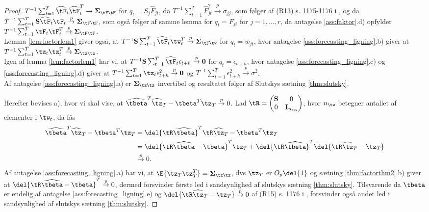\begin{proof}
\(T^{-1} \sum_{t=1}^T \widehat{\tF}_t \widehat{\tF}_t^T \rightarrow \boldsymbol{\Sigma}_{\tF \tF}\) for \(q_t = S_j \widehat{F}_{jt}\), da \(T^{-1} \sum_{t=1}^T \widehat{F}_{jt}^2 \overset{p}{\rightarrow} \sigma_{jj}\), som følger af (R13) s. 1175-1176 i \citep{stock_watson_2002a}, og da \(T^{-1} \sum_{t=1}^T \mathbf{S} \widehat{\tF}_t \tF_t \overset{p}{\rightarrow} \boldsymbol{\Sigma}_{\tF \tF}\), som også følger af samme lemma for \(q_t =F_{jt}\) for \(j=1,\ldots, r\), da antagelse \ref{ass:faktor}.d) opfylder \(T^{-1} \sum_{t=1}^T \tF_t \tF_t^T \overset{p}{\rightarrow} \boldsymbol{\Sigma}_{\tF\tF}\). \\ 
Lemma \ref{lem:factorlem1} giver også, at 
\(T^{-1} \mathbf{S} \sum_{t=1}^T \widehat{\tF}_t \tw_t^T \overset{p}{\rightarrow} \boldsymbol{\Sigma}_{\tF \tw}\) for \(q_t = w_{jt}\), hvor antagelse \ref{ass:forecasting_ligning}.b) giver at \(T^{-1} \sum_{t=1}^T \tz_t \tz_t^T \overset{p}{\rightarrow} \boldsymbol{\Sigma}_{\tz \tz}\). \\
Igen af lemma \ref{lem:factorlem1} har vi, at \(T^{-1} \mathbf{S} \sum_{t=1}^T \widehat{\tF}_t \epsilon_{t+h} \overset{p}{\rightarrow} \mathbf{0}\) for \(q_t = \epsilon_{t+h}\), hvor antagelse \ref{ass:forecasting_ligning}.c) og \ref{ass:forecasting_ligning}.d) giver at \(T^{-1} \sum_{t=1}^T \tz_t \epsilon_{t+h}^2 \overset{p}{\rightarrow} \mathbf{0}\) og \(T^{-1} \sum_{t=1}^T \epsilon_{t+h}^2 \overset{p}{\rightarrow} \sigma^2\). \\
Af antagelse \ref{ass:forecasting_ligning}.a) er \(\boldsymbol{\Sigma}_{\tz \tz}\) invertibel og resultatet følger af Slutskys sætning \ref{thm:slutsky}.

Herefter bevises a), hvor vi skal vise, at \(\widehat{\tbeta}^T \widehat{\tz}_T - \tbeta^T \tz_T \overset{p}{\rightarrow} 0\).
Lad \(\tR = \begin{pmatrix}
\mathbf{S} & 0 \\ 0 & \mathbf{I}_{n_{\tw}}
\end{pmatrix}\), hvor \(n_{\tw}\) betegner antallet af elementer i \(\tw_t\), da fås
\begin{align*}
\widehat{\tbeta}^T \widehat{\tz}_T - \tbeta^T \tz_T &= \del{\tR \widehat{\tbeta}}^T \tR \widehat{\tz}_T - \tbeta^T \tz_T \\
&= \del{\tR \widehat{\tbeta} - \tbeta}^T \tz_T + \del{\tR \widehat{\tbeta}}^T \del{\tR \widehat{\tz}_T - \tz_T} \\
&\overset{p}{\rightarrow} 0.
\end{align*}
Af antagelse \ref{ass:forecasting_ligning}.a) har vi, at \(\E{\tz_T \tz_T^T} = \boldsymbol{\Sigma}_{\tz \tz}\), dvs \(\tz_T\) er \(O_p \del{1}\) og sætning \ref{thm:factorthm2}.b) giver at \(\del{\tR \widehat{\tbeta} - \tbeta}^T \overset{p}{\rightarrow} 0\), dermed forsvinder første led i sandsynlighed af slutskys sætning \ref{thm:slutsky}.
Tilsvarende da \(\tbeta\) er endelig af antagelse \ref{ass:forecasting_ligning}.e) og \(\del{\tR \widehat{\tz}_T - \tz_T} \overset{p}{\rightarrow} 0\) af (R15) s. 1176 i \citep{stock_watson_2002a}, forsvinder også andet led i sandsynlighed af slutskys sætning \ref{thm:slutsky}. 
\end{proof}

